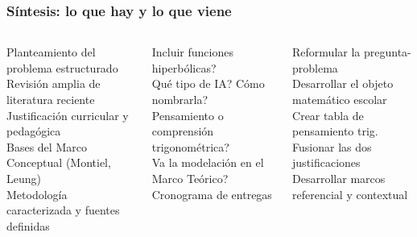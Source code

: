 \documentclass[11pt, aspectratio=169, spanish]{beamer}
\newcommand{\semOK}{\textcolor{VerdeOk}{\faCheckCircle}}
\newcommand{\semNO}{\textcolor{RojoAlerta}{\faTimesCircle}}
\begin{document}
\begin{frame}[plain]
\frametitle{\faStar\quad Síntesis: lo que hay y lo que viene}
\vspace{0pt}

\begin{columns}[T]
\begin{tcolorbox}[colback=VerdeOk!7, colframe=VerdeOk!55, arc=2mm,
  nobeforeafter, top=2pt, bottom=2pt,
  title={\footnotesize\textbf{\faCheckDouble\quad Fortalezas del documento}}]
{\scriptsize
\semOK\; Planteamiento del problema estructurado\\
\semOK\; Revisión amplia de literatura reciente\\
\semOK\; Justificación curricular y pedagógica\\
\semOK\; Bases del Marco Conceptual (Montiel, Leung)\\
\semOK\; Metodología caracterizada y fuentes definidas}
\end{tcolorbox}

\vspace{0.05cm}

\begin{tcolorbox}[colback=AzulInfo!6, colframe=AzulInfo!50, arc=2mm,
  nobeforeafter, top=2pt, bottom=2pt,
  title={\footnotesize\textbf{\faHandshake\quad Decisiones a tomar hoy}}]
{\scriptsize
\semNO\; \textquestiondown{}Incluir funciones hiperbólicas?\\
\semNO\; \textquestiondown{}Qué tipo de IA? \textquestiondown{}Cómo nombrarla?\\
\semNO\; \textquestiondown{}Pensamiento o comprensión trigonométrica?\\
\semNO\; \textquestiondown{}Va la modelación en el Marco Teórico?\\
\semNO\; Cronograma de entregas}
\end{tcolorbox}

\begin{tcolorbox}[colback=RojoAlerta!6, colframe=RojoAlerta!45, arc=2mm,
  nobeforeafter, top=2pt, bottom=2pt,
  title={\footnotesize\textbf{\faArrowRight\quad Prioridades de corrección}}]
{\scriptsize
\textcolor{RojoAlerta}{\faArrowRight}\; Reformular la pregunta-problema\\
\textcolor{RojoAlerta}{\faArrowRight}\; Desarrollar el objeto matemático escolar\\
\textcolor{RojoAlerta}{\faArrowRight}\; Crear tabla de pensamiento trig.\\
\textcolor{RojoAlerta}{\faArrowRight}\; Fusionar las dos justificaciones\\
\textcolor{RojoAlerta}{\faArrowRight}\; Desarrollar marcos referencial y contextual}
\end{tcolorbox}


\end{columns}
\end{frame}
\end{document}
